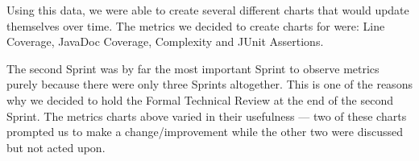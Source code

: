\documentclass[12pt]{article}
\begin{document}
Using this data, we were able to create several different charts that would update themselves over time. The metrics we decided to create charts for were: Line Coverage, JavaDoc Coverage, Complexity and JUnit Assertions.

\vspace{0.3cm}

\begin{center}
    \noindent{}
\end{center}

\newpage

The second Sprint was by far the most important Sprint to observe metrics purely because there were only three Sprints altogether. This is one of the reasons why we decided to hold the Formal Technical Review at the end of the second Sprint. The metrics charts above varied in their usefulness --- two of these charts prompted us to make a change/improvement while the other two were discussed but not acted upon.
\end{document}

